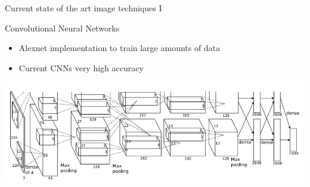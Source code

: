 \documentclass{beamer}
\begin{document}
    \begin{frame}{Current state of the art image techniques I}
        \begin{block}{Convolutional Neural Networks}
            \begin{itemize}
            \item Alexnet implementation to train large amounts of data \cite{alexnet}
            \item Current CNNs very high accuracy \cite{cnn}
            \end{itemize}
        \end{block}
        \includegraphics[width=\textwidth]{images/alexnet2012.png}
    \end{frame}
\end{document}
